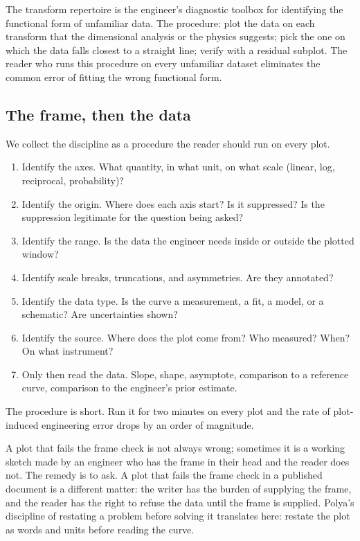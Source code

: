 The transform repertoire is the engineer's diagnostic toolbox for
identifying the functional form of unfamiliar data. The procedure:
plot the data on each transform that the dimensional analysis or
the physics suggests; pick the one on which the data falls closest
to a straight line; verify with a residual subplot. The reader who
runs this procedure on every unfamiliar dataset eliminates the
common error of fitting the wrong functional form.

\subsection{The frame, then the data}

We collect the discipline as a procedure the reader should run on
every plot.

\begin{enumerate}[leftmargin=*]
  \item Identify the axes. What quantity, in what unit, on what scale
    (linear, log, reciprocal, probability)?
  \item Identify the origin. Where does each axis start? Is it
    suppressed? Is the suppression legitimate for the question being
    asked?
  \item Identify the range. Is the data the engineer needs inside or
    outside the plotted window?
  \item Identify scale breaks, truncations, and asymmetries. Are they
    annotated?
  \item Identify the data type. Is the curve a measurement, a fit,
    a model, or a schematic? Are uncertainties shown?
  \item Identify the source. Where does the plot come from? Who
    measured? When? On what instrument?
  \item Only then read the data. Slope, shape, asymptote, comparison
    to a reference curve, comparison to the engineer's prior estimate.
\end{enumerate}

The procedure is short. Run it for two minutes on every plot and the
rate of plot-induced engineering error drops by an order of magnitude.

\begin{mastery}
A plot that fails the frame check is not always wrong; sometimes it
is a working sketch made by an engineer who has the frame in their
head and the reader does not. The remedy is to ask. A plot that
fails the frame check in a published document is a different matter:
the writer has the burden of supplying the frame, and the reader has
the right to refuse the data until the frame is supplied. Polya's
discipline of restating a problem before solving it
\cite{gen:polya1945} translates here: restate the plot as words and
units before reading the curve.
\end{mastery}

